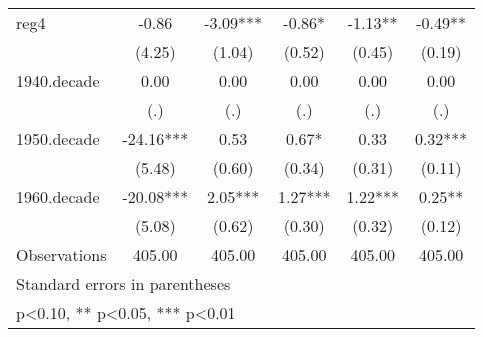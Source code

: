 {\begin{tabular}{l*{5}{c}}
\addlinespace
reg4            &      -0.86   &      -3.09***&      -0.86*  &      -1.13** &      -0.49** \\
                &     (4.25)   &     (1.04)   &     (0.52)   &     (0.45)   &     (0.19)   \\
\addlinespace
1940.decade     &       0.00   &       0.00   &       0.00   &       0.00   &       0.00   \\
                &        (.)   &        (.)   &        (.)   &        (.)   &        (.)   \\
\addlinespace
1950.decade     &     -24.16***&       0.53   &       0.67*  &       0.33   &       0.32***\\
                &     (5.48)   &     (0.60)   &     (0.34)   &     (0.31)   &     (0.11)   \\
\addlinespace
1960.decade     &     -20.08***&       2.05***&       1.27***&       1.22***&       0.25** \\
                &     (5.08)   &     (0.62)   &     (0.30)   &     (0.32)   &     (0.12)   \\
\midrule
Observations    &     405.00   &     405.00   &     405.00   &     405.00   &     405.00   \\
\bottomrule
\multicolumn{6}{l}{\footnotesize Standard errors in parentheses}\\
\multicolumn{6}{l}{\footnotesize * p<0.10, ** p<0.05, *** p<0.01}\\
\end{tabular}
}
